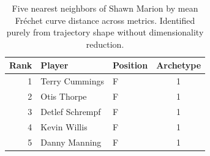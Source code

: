 \begin{table}[htbp]
  \centering\small
  \begin{tabular}{rllc}
    \toprule
    Rank & Player & Position & Archetype \\
    \midrule
    1 & Terry Cummings & F & 1 \\
    2 & Otis Thorpe & F & 1 \\
    3 & Detlef Schrempf & F & 1 \\
    4 & Kevin Willis & F & 1 \\
    5 & Danny Manning & F & 1 \\
    \bottomrule
  \end{tabular}
  \caption{Five nearest neighbors of Shawn Marion by mean Fr\'{e}chet curve distance across metrics. Identified purely from trajectory shape without dimensionality reduction.}
  \label{tab:Shawn_Marion_frechet_curve_neighbors}
\end{table}

